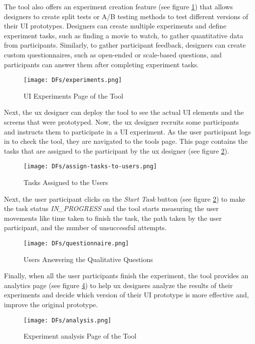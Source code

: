The tool also offers an experiment creation feature (see figure \ref{implementation:fig:experiments}) that allows designers to create split tests or A/B testing methods to test different versions of their UI prototypes. 
Designers can create multiple experiments and define experiment tasks, such as finding a movie to watch, to gather quantitative data from participants.
Similarly, to gather participant feedback, designers can create custom questionnaires, such as open-ended or scale-based questions, and participants can answer them after completing experiment tasks.
\begin{figure}[ht]
    \centering
    \texttt{[image: DFs/experiments.png]}
    \caption{UI Experiments Page of the Tool}
    \label{implementation:fig:experiments}
\end{figure}

Next, the \ac{ux} designer can deploy the tool to see the actual UI elements and the screens that were prototyped.
Now, the \ac{ux} designer recruits some participants and instructs them to participate in a UI experiment.
As the user participant logs in to check the tool, they are navigated to the tools page. 
This page contains the tasks that are assigned to the participant by the \ac{ux} designer (see figure \ref{implementation:fig:user-tasks}).
\clearpage
\begin{figure}[ht]
    \centering
    \texttt{[image: DFs/assign-tasks-to-users.png]}
    \caption{Tasks Assigned to the Users}
    \label{implementation:fig:user-tasks}
\end{figure}

Next, the user participant clicks on the \textit{Start Task} button (see figure \ref{implementation:fig:user-tasks}) to make the task status \textit{IN\_PROGRESS} and the tool starts measuring the user movements like time taken to finish the task, the path taken by the user participant, and the number of unsuccessful attempts.

\begin{figure}[ht]
    \centering
    \texttt{[image: DFs/questionnaire.png]}
    \caption{Users Answering the Qualitative Questions}
    \label{implementation:fig:user-qualitative}
\end{figure}

Finally, when all the user participants finish the experiment, the tool provides an analytics page (see figure \ref{implementation:fig:analysis}) to help \ac{ux} designers analyze the results of their experiments and decide which version of their UI prototype is more effective and, improve the original prototype. 
\begin{figure}[ht]
    \centering
    \texttt{[image: DFs/analysis.png]}
    \caption{Experiment analysis Page of the Tool}
    \label{implementation:fig:analysis}
\end{figure}

